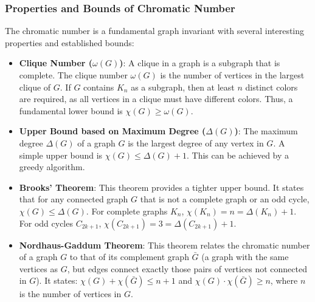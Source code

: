 \documentclass[11pt, a4paper]{article}
\begin{document}
\subsubsection{Properties and Bounds of Chromatic Number}
The chromatic number is a fundamental graph invariant with several interesting properties and established bounds:
\begin{itemize}[noitemsep,topsep=3pt,parsep=3pt,partopsep=0pt]
    \item \textbf{Clique Number ($\omega(G)$)}: A clique in a graph is a subgraph that is complete. The clique number $\omega(G)$ is the number of vertices in the largest clique of $G$. If $G$ contains $K_n$ as a subgraph, then at least $n$ distinct colors are required, as all vertices in a clique must have different colors. Thus, a fundamental lower bound is $\chi(G) \ge \omega(G)$.
    \item \textbf{Upper Bound based on Maximum Degree ($\Delta(G)$)}: The maximum degree $\Delta(G)$ of a graph $G$ is the largest degree of any vertex in $G$. A simple upper bound is $\chi(G) \le \Delta(G) + 1$. This can be achieved by a greedy algorithm.
    \item \textbf{Brooks' Theorem}: This theorem provides a tighter upper bound. It states that for any connected graph $G$ that is not a complete graph or an odd cycle, $\chi(G) \le \Delta(G)$. For complete graphs $K_n$, $\chi(K_n)=n=\Delta(K_n)+1$. For odd cycles $C_{2k+1}$, $\chi(C_{2k+1})=3=\Delta(C_{2k+1})+1$.
    \item \textbf{Nordhaus-Gaddum Theorem}: This theorem relates the chromatic number of a graph $G$ to that of its complement graph $\bar{G}$ (a graph with the same vertices as $G$, but edges connect exactly those pairs of vertices not connected in $G$). It states: $\chi(G) + \chi(\bar{G}) \le n+1$ and $\chi(G) \cdot \chi(\bar{G}) \ge n$, where $n$ is the number of vertices in $G$.
\end{itemize}
\end{document}
